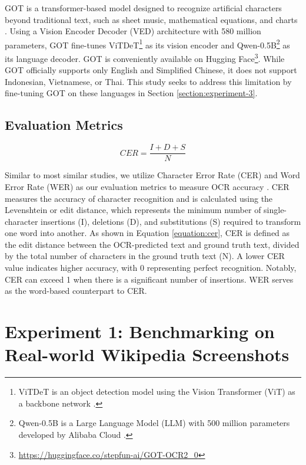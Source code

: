 \documentclass[12pt,oneside]{memoir}
\begin{document}
GOT is a transformer-based model designed to recognize artificial characters beyond traditional text, such as sheet music, mathematical equations, and charts \parencite{wei-etal-2024}. 
Using a Vision Encoder Decoder (VED) architecture with 580 million parameters, GOT fine-tunes ViTDeT\footnote{ViTDeT is an object detection model using the Vision Transformer (ViT) as a backbone network \parencite{li-etal-2022}.} as its vision encoder and Qwen-0.5B\footnote{Qwen-0.5B is a Large Language Model (LLM) with 500 million parameters developed by Alibaba Cloud \parencite{qwen-2025}.} as its language decoder. 
GOT is conveniently available on Hugging Face\footnote{\url{https://huggingface.co/stepfun-ai/GOT-OCR2_0}}.
While GOT officially supports only English and Simplified Chinese, it does not support Indonesian, Vietnamese, or Thai. 
This study seeks to address this limitation by fine-tuning GOT on these languages in Section \ref{section:experiment-3}.

\subsection{Evaluation Metrics}

\begin{equation}
    CER = \frac{I + D + S}{N}
    \label{equation:cer}
\end{equation}

Similar to most similar studies, we utilize Character Error Rate (CER) and Word Error Rate (WER) as our evaluation metrics to measure OCR accuracy \parencite{hegghammer-2022, ignat-etal-2022}. 
CER measures the accuracy of character recognition and is calculated using the Levenshtein or edit distance, which represents the minimum number of single-character insertions (I), deletions (D), and substitutions (S) required to transform one word into another. 
As shown in Equation \ref{equation:cer}, CER is defined as the edit distance between the OCR-predicted text and ground truth text, divided by the total number of characters in the ground truth text (N). 
A lower CER value indicates higher accuracy, with 0 representing perfect recognition. 
Notably, CER can exceed 1 when there is a significant number of insertions. 
WER serves as the word-based counterpart to CER.

\section{Experiment 1: Benchmarking on Real-world Wikipedia Screenshots} \label{section:experiment-1}
\end{document}
